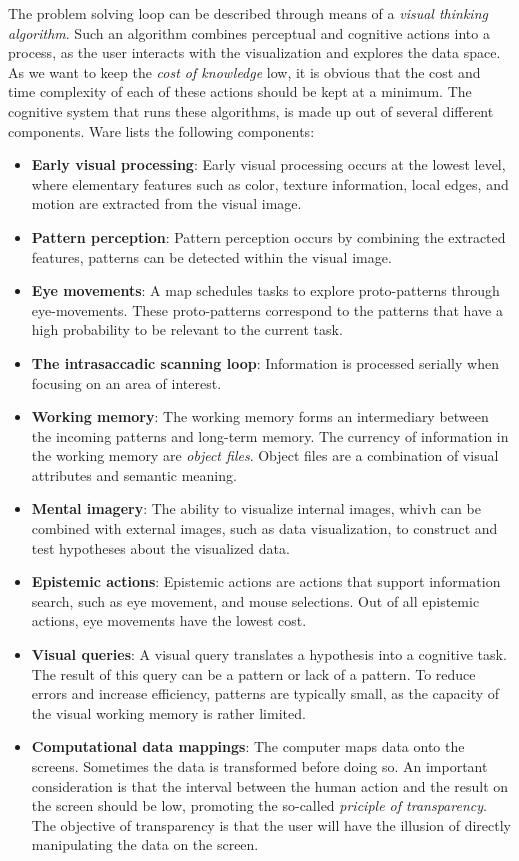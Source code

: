 The problem solving loop can be described through means of a \emph{visual thinking algorithm}\cite{ware:2004}. Such an algorithm combines perceptual and cognitive actions into a process, as the user interacts with the visualization and explores the data space. As we want to keep the \emph{cost of knowledge} low, it is obvious that the cost and time complexity of each of these actions should be kept at a minimum. The cognitive system that runs these algorithms, is made up out of several different components. Ware lists the following components\cite{ware:2004}:

\begin{itemize}
	\item \textbf{Early visual processing}: Early visual processing occurs at the lowest level, where elementary features such as color, texture information, local edges, and motion are extracted from the visual image.
	\item \textbf{Pattern perception}: Pattern perception occurs by combining the extracted features, patterns can be detected within the visual image.
	\item \textbf{Eye movements}: A map schedules tasks to explore proto-patterns through eye-movements. These proto-patterns correspond to the patterns that have a high probability to be relevant to the current task.
	\item \textbf{The intrasaccadic scanning loop}: Information is processed serially when focusing on an area of interest.
	\item \textbf{Working memory}: The working memory forms an intermediary between the incoming patterns and long-term memory. The currency of information in the working memory are \emph{object files}. Object files are a combination of visual attributes and semantic meaning.
	\item \textbf{Mental imagery}: The ability to visualize internal images, whivh can be combined with external images, such as data visualization, to construct and test hypotheses about the visualized data.
	\item \textbf{Epistemic actions}: Epistemic actions are actions that support information search, such as eye movement, and mouse selections. Out of all epistemic actions, eye movements have the lowest cost.
	\item \textbf{Visual queries}: A visual query translates a hypothesis into a cognitive task. The result of this query can be a pattern or lack of a pattern. To reduce errors and increase efficiency, patterns are typically small, as the capacity of the visual working memory is rather limited.
	\item \textbf{Computational data mappings}: The computer maps data onto the screens. Sometimes the data is transformed before doing so. An important consideration is that the interval between the human action and the result on the screen should be low, promoting the so-called \emph{priciple of transparency}. The objective of transparency is that the user will have the illusion of directly manipulating the data on the screen.
\end{itemize}

